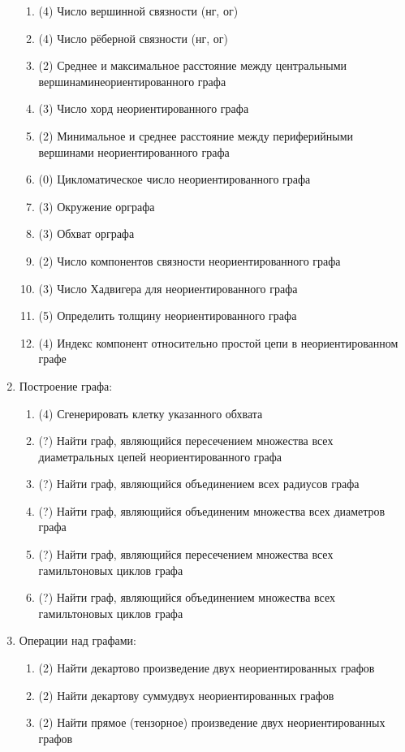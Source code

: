 \begin{enumerate}
\begin{enumerate}[1.]
  \item (4) Число вершинной связности (нг, ог)
  \item (4) Число рёберной связности (нг, ог)
  \item (2) Среднее и максимальное расстояние между центральными вершинаминеориентированного графа  
  \item (3) Число хорд неориентированного графа 
  \item (2) Минимальное и среднее расстояние между периферийными вершинами неориентированного графа  
  \item (0) Цикломатическое число неориентированного графа  
  \item (3) Окружение орграфа  
  \item (3) Обхват орграфа  
  \item (2) Число компонентов связности неориентированного графа  
  \item (3) Число Хадвигера для неориентированного графа 
  \item (5) Определить толщину неориентированного графа 
  \item (4) Индекс компонент относительно простой цепи в неориентированном графе 
  \end{enumerate}
\item Построение графа:
  \begin{enumerate}[1.]
  \item (4) Сгенерировать клетку указанного обхвата  
  \item (?) Найти граф, являющийся пересечением множества всех диаметральных цепей неориентированного графа  
  \item (?) Найти граф, являющийся объединением всех радиусов графа  
  \item (?) Найти граф, являющийся объединеним множества всех диаметров графа  
  \item (?) Найти граф, являющийся пересечением множества всех гамильтоновых циклов графа  
  \item (?) Найти граф, являющийся объединением множества всех гамильтоновых циклов графа  
  \end{enumerate}
\item Операции над графами:
  \begin{enumerate}[1.]
  \item (2) Найти декартово произведение двух неориентированных графов 
  \item (2) Найти декартову суммудвух неориентированных графов 
  \item (2) Найти прямое (тензорное) произведение двух неориентированных графов 

\end{enumerate}
\end{enumerate}
